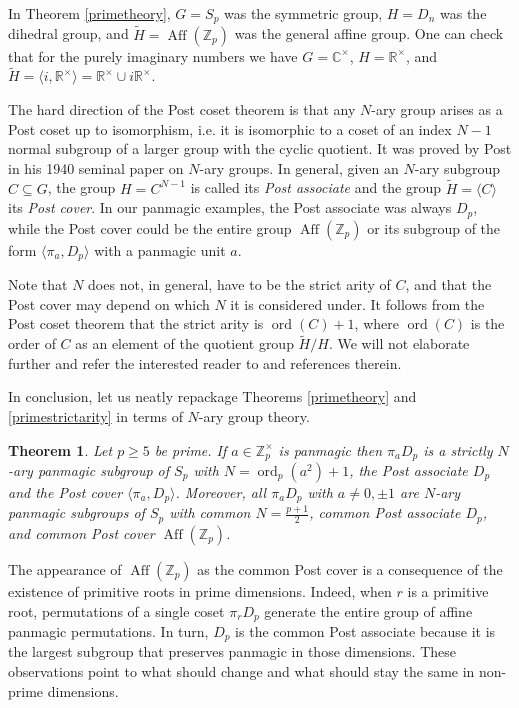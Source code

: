 \documentclass[11pt]{article}
\theoremstyle{plain}
\newtheorem{theorem}{Theorem}
\theoremstyle{definition}
\newcommand{\+}[1]{{#1}^\times}
\def\Aff{\operatorname{Aff}}
\DeclareMathOperator{\ord}{ord}
\def\R{{\mathbb R}}
\def\Z{{\mathbb Z}}
\def\C{{\mathbb C}}
\def\H{\widetilde{H}}
\begin{document}
\noindent In Theorem \ref{primetheory}, $G=S_p$ was the symmetric group, $H=D_n$ was the dihedral group, and $\H=\Aff(\Z_p)$ was the general affine group. One can check that for the purely imaginary numbers we have $G=\+{\C}$, $H=\+{\R}$, and $\H=\langle i,\+{\R}\rangle=\+{\R}\cup i\+{\R}$.

The hard direction of the Post coset theorem is that any $N$-ary group arises as a Post coset up to isomorphism, i.e. it is isomorphic to a coset of an index $N-1$ normal subgroup of a larger group with the cyclic quotient. It was proved by Post in his 1940 seminal paper on $N$-ary groups. In general, given an $N$-ary subgroup $C\subseteq G$, the group $H=C^{N-1}$ is called its {\it Post associate} and the group $\H=\langle C\rangle$ its {\it Post cover}. In our panmagic examples, the Post associate was always $D_p$, while the Post cover could be the entire group 
$\Aff(\Z_p)$ or its subgroup of the form $\langle\pi_a,D_p\rangle$ with a panmagic unit $a$. 

Note that $N$ does not, in general, have to be the strict arity of $C$, and that the Post cover may depend on which $N$ it is considered under. It follows from the Post coset theorem that the strict arity is $\ord(C)+1$, where $\ord(C)$ is the order of $C$ as an element of the quotient group $\H/H$. We will not elaborate further and refer the interested reader to \cite{GBV,Shah} and references therein. 

In conclusion, let us neatly repackage Theorems \ref{primetheory} and \ref{primestrictarity} in terms of $N$-ary group theory.
\begin{theorem} Let $p\geq5$ be prime. If $a\in\Z_p^{\times}$ is panmagic then $\pi_aD_p$ is a strictly $N$-ary panmagic subgroup of $S_p$ with $N=\ord_p(a^2)+1$, the Post associate $D_p$ and the Post cover $\langle\pi_a,D_p\rangle$. Moreover, all $\pi_aD_p$ with $a\neq0,\pm1$ are $N$-ary panmagic subgroups of $S_p$ with  common $N=\frac{p+1}{2}$, common Post associate $D_p$, and common Post cover $\Aff(\Z_p)$.
\end{theorem}
\noindent The appearance of $\Aff(\Z_p)$ as the common Post cover is a consequence of the existence of primitive roots in prime dimensions. Indeed, when $r$ is a primitive root, permutations of a single coset $\pi_rD_p$ generate the entire group of affine panmagic permutations. In turn, $D_p$ is the common Post associate because it is the largest subgroup that preserves panmagic in those dimensions. These observations point to what should change and what should stay the same in non-prime dimensions.
\end{document}
